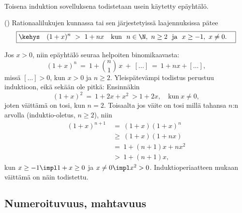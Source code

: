Toisena induktion sovelluksena todistetaan usein käytetty epäyhtälö.
\begin{Prop} () \label{Bernoulli} 
Rationaalilukujen kunnassa tai sen järjestetyissä laajennuksissa pätee
\[
\boxed{\kehys\quad (1+x)^n\ >\ 1+nx \quad 
     \text{kun}\ \  n \in \N,\ n \ge 2\ \ \text{ja}\ \ x \ge -1,\ x \neq 0. \quad}
\] 
\end{Prop}
\tod Jos $x>0$, niin epäyhtälö seuraa helpoiten binomikaavasta:
\[
(1+x)^n\ =\ 1 + \binom{n}{1}\,x\ +\ [\ldots]\ =\ 1 + nx + [\ldots],
\]
missä $[\ldots] > 0$, kun $x>0$ ja $n \ge 2$. Yleispätevämpi todistus perustuu induktioon,
eikä sekään ole pitkä: Ensinnäkin
\[
(1+x)^2\ =\ 1+2x+x^2\ > 1+2x, \quad \text{kun}\ x \neq 0,
\]
joten väittämä on tosi, kun $n=2$. Toisaalta jos väite on tosi millä tahansa $n$:n arvolla 
(induktio-oletus, $n \ge 2$), niin
\begin{align*}
(1+x)^{n+1}\ &=\   (1+x)(1+x)^n      \\
             &\ge\ (1+x)(1+nx)       \\ 
             &=\   1 + (n+1)x + nx^2 \\
             &>\   1 + (n+1)x,
\end{align*}
kun $x \ge -1 \impl 1+x \ge 0$ ja $x \neq 0 \impl x^2 > 0$. Induktioperiaatteen mukaan väittämä
on näin todistettu. \loppu

\subsection{Numeroituvuus, mahtavuus}

